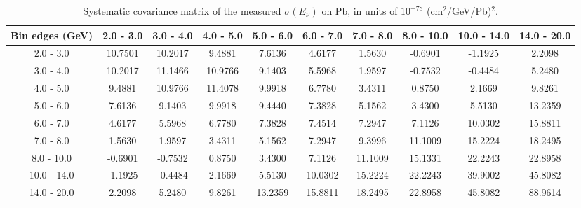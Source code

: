 \documentclass[aps,prl,twocolumn,superscriptaddress,nofootinbib]{revtex4-1}
\begin{document}
\begin{table}[h!]
  \centering
  \caption{Systematic covariance matrix of the measured $\sigma(E_{\nu})$ on Pb, in units of $10^{-78}$ (cm$^{2}$/GeV/Pb)$^{2}$.}
    \begin{tabular}{c||ccccccccc}
      Bin edges (GeV) & 2.0 - 3.0 & 3.0 - 4.0 & 4.0 - 5.0 & 5.0 - 6.0 & 6.0 - 7.0 & 7.0 - 8.0 & 8.0 - 10.0 & 10.0 - 14.0 & 14.0 - 20.0 \\
\hline \hline
        2.0 - 3.0 & 10.7501 & 10.2017 &  9.4881 &  7.6136 &  4.6177 &  1.5630 & -0.6901 & -1.1925 &  2.2098 \\
        3.0 - 4.0 & 10.2017 & 11.1466 & 10.9766 &  9.1403 &  5.5968 &  1.9597 & -0.7532 & -0.4484 &  5.2480 \\
        4.0 - 5.0 &  9.4881 & 10.9766 & 11.4078 &  9.9918 &  6.7780 &  3.4311 &  0.8750 &  2.1669 &  9.8261 \\
        5.0 - 6.0 &  7.6136 &  9.1403 &  9.9918 &  9.4440 &  7.3828 &  5.1562 &  3.4300 &  5.5130 & 13.2359 \\
        6.0 - 7.0 &  4.6177 &  5.5968 &  6.7780 &  7.3828 &  7.4514 &  7.2947 &  7.1126 & 10.0302 & 15.8811 \\
        7.0 - 8.0 &  1.5630 &  1.9597 &  3.4311 &  5.1562 &  7.2947 &  9.3996 & 11.1009 & 15.2224 & 18.2495 \\
       8.0 - 10.0 & -0.6901 & -0.7532 &  0.8750 &  3.4300 &  7.1126 & 11.1009 & 15.1331 & 22.2243 & 22.8958 \\
      10.0 - 14.0 & -1.1925 & -0.4484 &  2.1669 &  5.5130 & 10.0302 & 15.2224 & 22.2243 & 39.9002 & 45.8082 \\
      14.0 - 20.0 &  2.2098 &  5.2480 &  9.8261 & 13.2359 & 15.8811 & 18.2495 & 22.8958 & 45.8082 & 88.9614 \\
    \end{tabular}
  \label{tablecov:Pb_Systematic_Enu}
\end{table}
\end{document}
